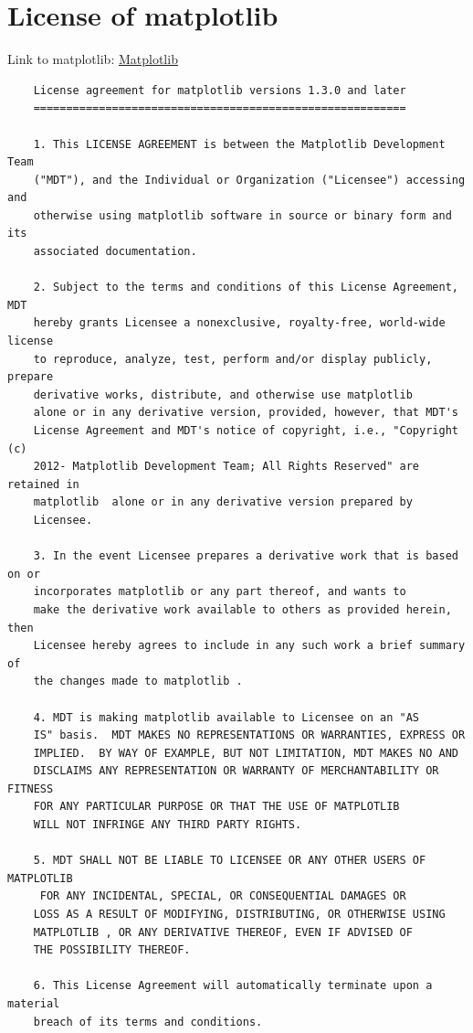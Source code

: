 \documentclass{article}
\begin{document}
\section{License of matplotlib}
Link to matplotlib: \href{https://github.com/matplotlib/matplotlib}{Matplotlib}
\begin{verbatim}
    License agreement for matplotlib versions 1.3.0 and later
    =========================================================
    
    1. This LICENSE AGREEMENT is between the Matplotlib Development Team
    ("MDT"), and the Individual or Organization ("Licensee") accessing and
    otherwise using matplotlib software in source or binary form and its
    associated documentation.
    
    2. Subject to the terms and conditions of this License Agreement, MDT
    hereby grants Licensee a nonexclusive, royalty-free, world-wide license
    to reproduce, analyze, test, perform and/or display publicly, prepare
    derivative works, distribute, and otherwise use matplotlib
    alone or in any derivative version, provided, however, that MDT's
    License Agreement and MDT's notice of copyright, i.e., "Copyright (c)
    2012- Matplotlib Development Team; All Rights Reserved" are retained in
    matplotlib  alone or in any derivative version prepared by
    Licensee.
    
    3. In the event Licensee prepares a derivative work that is based on or
    incorporates matplotlib or any part thereof, and wants to
    make the derivative work available to others as provided herein, then
    Licensee hereby agrees to include in any such work a brief summary of
    the changes made to matplotlib .
    
    4. MDT is making matplotlib available to Licensee on an "AS
    IS" basis.  MDT MAKES NO REPRESENTATIONS OR WARRANTIES, EXPRESS OR
    IMPLIED.  BY WAY OF EXAMPLE, BUT NOT LIMITATION, MDT MAKES NO AND
    DISCLAIMS ANY REPRESENTATION OR WARRANTY OF MERCHANTABILITY OR FITNESS
    FOR ANY PARTICULAR PURPOSE OR THAT THE USE OF MATPLOTLIB
    WILL NOT INFRINGE ANY THIRD PARTY RIGHTS.
    
    5. MDT SHALL NOT BE LIABLE TO LICENSEE OR ANY OTHER USERS OF MATPLOTLIB
     FOR ANY INCIDENTAL, SPECIAL, OR CONSEQUENTIAL DAMAGES OR
    LOSS AS A RESULT OF MODIFYING, DISTRIBUTING, OR OTHERWISE USING
    MATPLOTLIB , OR ANY DERIVATIVE THEREOF, EVEN IF ADVISED OF
    THE POSSIBILITY THEREOF.
    
    6. This License Agreement will automatically terminate upon a material
    breach of its terms and conditions.
    

\end{verbatim}
\end{document}
